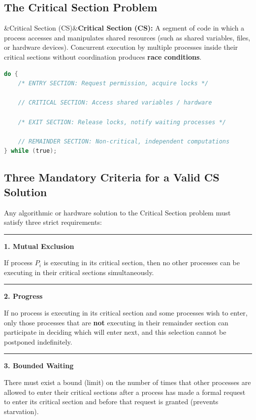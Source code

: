 \documentclass[11pt,a4paper]{article}
\newcommand{\concept}[1]{%
  \noindent\textcolor{AnthGreen}{\rule{3pt}{10pt}}\enspace
  \textbf{\color{AnthDark}#1}\par\vspace{2pt}%
}
\newenvironment{Def}[1][]{\begin{tcolorbox}[defbox]\ifx&#1&\else\textbf{#1:}\enspace\fi}{\end{tcolorbox}}
\begin{document}
\subsection{The Critical Section Problem}

\begin{Def}[Critical Section (CS)]
A segment of code in which a process accesses and manipulates shared resources (such as shared variables, files, or hardware devices). Concurrent execution by multiple processes inside their critical sections without coordination produces \textbf{race conditions}.
\end{Def}

\begin{tcolorbox}[codebox, title={General Structure of a Synchronized Process}]
\begin{lstlisting}[language=C]
do {
    /* ENTRY SECTION: Request permission, acquire locks */
    
    // CRITICAL SECTION: Access shared variables / hardware
    
    /* EXIT SECTION: Release locks, notify waiting processes */
    
    // REMAINDER SECTION: Non-critical, independent computations
} while (true);
\end{lstlisting}
\end{tcolorbox}

\subsection{Three Mandatory Criteria for a Valid CS Solution}

Any algorithmic or hardware solution to the Critical Section problem must satisfy three strict requirements:

\concept{1. Mutual Exclusion}
If process $P_i$ is executing in its critical section, then no other processes can be executing in their critical sections simultaneously.

\concept{2. Progress}
If no process is executing in its critical section and some processes wish to enter, only those processes that are \textbf{not} executing in their remainder section can participate in deciding which will enter next, and this selection cannot be postponed indefinitely.

\concept{3. Bounded Waiting}
There must exist a bound (limit) on the number of times that other processes are allowed to enter their critical sections after a process has made a formal request to enter its critical section and before that request is granted (prevents starvation).
\end{document}
